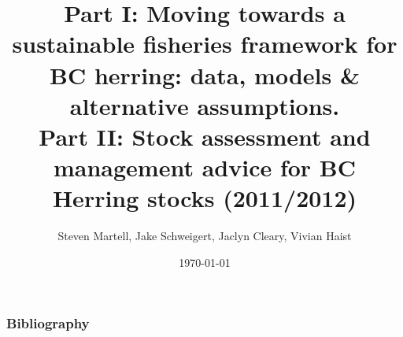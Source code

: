 \documentclass{beamer}
\title[2011 BC Herring Assessment]{Part I: Moving towards a sustainable fisheries framework for BC herring: data, models \& alternative assumptions.\\
\vfill
Part II: Stock assessment and management advice for BC Herring stocks (2011/2012)\\}
\author{Steven Martell, Jake Schweigert, Jaclyn Cleary, Vivian Haist}
\institute[UBC]
{
University of British Columbia \\
\medskip
{\emph{martell.steve@gmail.com}}
}
\date{\today}
\begin{document}
	\def\newblock{\hskip .11em plus .33em minus .07em}
%
\begin{frame}
\titlepage
\end{frame}
%


\begin{frame}[t]\frametitle{Bibliography}
	\def\newblock{\hskip .11em plus .33em minus .07em}
	
		
\end{frame}
%


\end{document}
